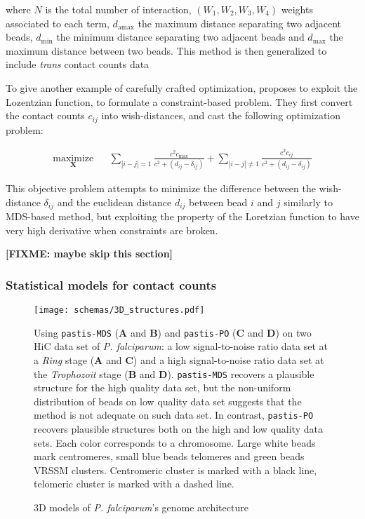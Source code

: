\documentclass[2columns]{article}
\newcommand{\fixme}[1]{\textbf{[FIXME: #1]}}
\newcommand{\Xb}{\textbf{X}}
\begin{document}
where $N$ is the total number of interaction, $(W_1, W_2, W_3, W_4)$ weights
associated to each term, $d_\text{amax}$ the maximum distance separating two
adjacent beads, $d_\text{min}$ the minimum distance separating two adjacent
beads and $d_\text{max}$ the maximum distance between two beads. 
This method is then generalized to include \textit{trans} contact counts data
\citep{trieu:MOGEN}

To give another example of carefully crafted optimization, \cite{trieu:3D}
proposes to exploit the Lozentzian function, to formulate a constraint-based
problem. They first convert the contact counts $c_{ij}$ into wish-distances,
and cast the following optimization problem:

\begin{equation*}
\renewcommand{\arraystretch}{2}
\begin{array}{ccl}
\underset{\Xb}{\text{maximize}} & & \underset{| i - j | = 1}{\sum} \frac{c^2
c_\text{max}}{c^2 + (d_{ij} - \delta_{ij})} + 
\underset{| i - j | \neq 1}{\sum} \frac{c^2 c_{ij}}{c^2 + (d_{ij} - \delta_{ij})}
\end{array}
\end{equation*}

This objective problem attempts to minimize the difference between the
wish-distance $\delta_{ij}$ and the euclidean distance $d_{ij}$ between bead
$i$ and $j$ similarly to MDS-based method, but exploiting the property of the
Loretzian function to have very high derivative when constraints are broken.

\fixme{maybe skip this section}


\subsubsection*{Statistical models for contact counts}

\begin{figure}
\texttt{[image: schemas/3D\_structures.pdf]}
\caption{3D models of {\em P. falciparum}'s genome architecture}{Using
\texttt{pastis-MDS} (\textbf{A} and \textbf{B}) and \texttt{pastis-PO}
(\textbf{C} and \textbf{D}) on two
HiC data set of {\em P. falciparum}: a low signal-to-noise ratio data set
at a {\em Ring} stage \citep{lemieux:genome-wide}
(\textbf{A} and \textbf{C}) and a high signal-to-noise ratio data set
at the {\em Trophozoit} stage \citep{ay:three-dimensional}
(\textbf{B} and \textbf{D}). \texttt{pastis-MDS} recovers a plausible
structure for the high quality data set, but the non-uniform distribution of
beads on low quality data set suggests that the method is not adequate on such
data set. In contrast, \texttt{pastis-PO} recovers plausible structures both
on the high and low quality data sets.
Each color corresponds to a chromosome.
Large white beads mark centromeres, small blue beads telomeres and green beads
VRSSM clusters. Centromeric cluster is marked with a black line, telomeric
cluster is marked with a dashed line.
}
\label{fig:3D_structures}
\end{figure}
\end{document}
